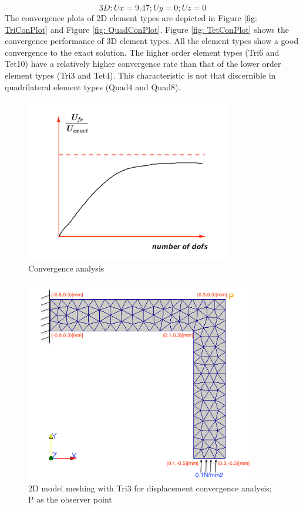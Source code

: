\begin{equation*}
3D: Ux = 9.47; Uy = 0; Uz = 0
\end{equation*}
The convergence plots of 2D element types are depicted in Figure \ref{fig: TriConPlot} and Figure \ref{fig: QuadConPlot}. Figure \ref{fig: TetConPlot} shows the convergence performance of 3D element types. All the element types show a good convergence to the exact solution. The higher order element types (Tri6 and Tet10) have a relatively higher convergence rate than that of the lower order element types (Tri3 and Tet4). This characteristic is not that discernible in quadrilateral element types (Quad4 and Quad8). 

\begin{figure}[htbp]
	\begin{center}	
		\includegraphics[width=9cm,clip]{convergence.pdf} 			
		\caption{Convergence analysis} \label{fig: convergence}
	\end{center}
\end{figure}


\begin{figure}[htbp]
	\begin{center}	
		\includegraphics[width=10cm,clip]{Convergence2D.png} 			
		\caption{2D model meshing with Tri3 for displacement convergence analysis; P as the observer point} \label{fig: Convergence2D}
	\end{center}
\end{figure}

